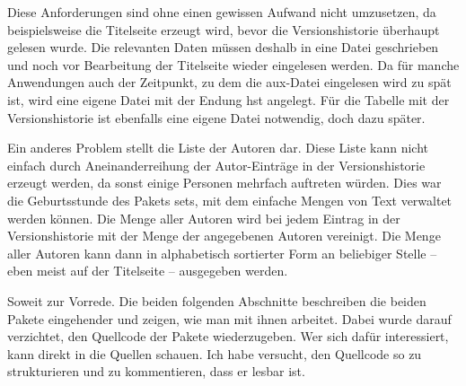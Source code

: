 Diese Anforderungen sind ohne einen gewissen Aufwand nicht umzusetzen, da beispielsweise die Titelseite erzeugt wird, bevor die Versionshistorie überhaupt gelesen wurde. Die relevanten Daten müssen deshalb in eine Datei geschrieben und noch vor Bearbeitung der Titelseite wieder eingelesen werden. Da für manche Anwendungen auch der Zeitpunkt, zu dem die aux-Datei eingelesen wird zu spät ist, wird eine eigene Datei mit der Endung hst angelegt.
Für die Tabelle mit der Versionshistorie ist ebenfalls eine eigene Datei notwendig, doch dazu später.

Ein anderes Problem stellt die Liste der Autoren dar. Diese Liste kann nicht einfach durch Aneinanderreihung der Autor-Einträge in der Versionshistorie erzeugt werden, da sonst einige Personen mehrfach auftreten würden. Dies war die Geburtsstunde des Pakets sets, mit dem einfache Mengen von Text verwaltet werden können. Die Menge aller Autoren wird bei jedem Eintrag in der Versionshistorie mit der Menge der angegebenen Autoren vereinigt. Die Menge aller Autoren kann dann in alphabetisch sortierter Form an beliebiger Stelle -- eben meist auf der Titelseite -- ausgegeben werden.

Soweit zur Vorrede. Die beiden folgenden Abschnitte beschreiben die beiden Pakete eingehender und zeigen, wie man mit ihnen arbeitet. Dabei wurde darauf verzichtet, den Quellcode der Pakete wiederzugeben. Wer sich dafür interessiert, kann direkt in die Quellen schauen. Ich habe versucht, den Quellcode so zu strukturieren und zu kommentieren, dass er lesbar ist. 

